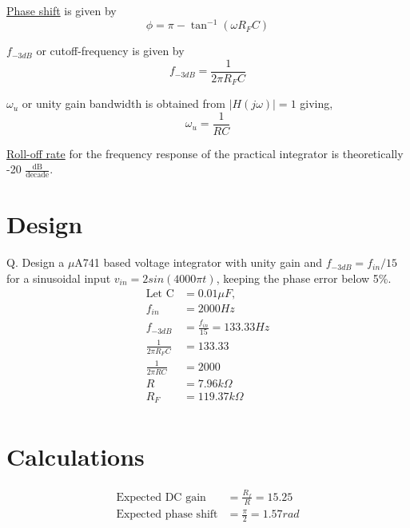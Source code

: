 \documentclass[12pt, titlepage]{article}
\theoremstyle{definition}
\begin{document}
    \underline{Phase shift} is given by
    \begin{equation}\label{eq:phase_shift}
      \phi = \pi - \tan^{-1}(\omega R_FC)
    \end{equation}

    \underline{$f_{-3dB}$} or cutoff-frequency is given by
    \begin{equation}\label{eq:f3db}
      f_{-3dB} = \frac{1}{2\pi R_FC}
    \end{equation}

    \underline{$\omega_u$} or unity gain bandwidth is obtained from $|H(j\omega)| = 1$ giving,
    \begin{equation}\label{eq:unity_gain_bw}
      \omega_u = \frac{1}{RC}
    \end{equation}

    \underline{Roll-off rate} for the frequency response of the practical integrator is theoretically -20 $\frac{\text{dB}}{\text{decade}}$.


  \newpage
  \section{Design}
    Q. Design a $\mu$A741 based voltage integrator with unity gain and
    $f_{-3dB} = f_{in}/15$ for a sinusoidal input
    $v_{in} = 2 sin(4000\pi t)$, keeping the phase error below 5\%.
    \begin{align*}
        \text{Let C} \! &=0.01\mu F , \\
        f_{in} &=2000 Hz\\
        f_{-3dB} &=\frac{f_{in}}{15} = 133.33 Hz \\
        \frac{1}{2\pi R_{F}C} &= 133.33\\
        \frac{1}{2\pi RC} &= 2000\\
        R &=7.96k\Omega\\
        R_{F} &=119.37k\Omega\\
    \end{align*}


  \section{Calculations}
  \begin{align*}
    \text{Expected DC gain} &= \frac{R_{f}}{R}=15.25\\
    \text{Expected phase shift} &= \frac{\pi}{2}=1.57 rad
  \end{align*}
\end{document}
